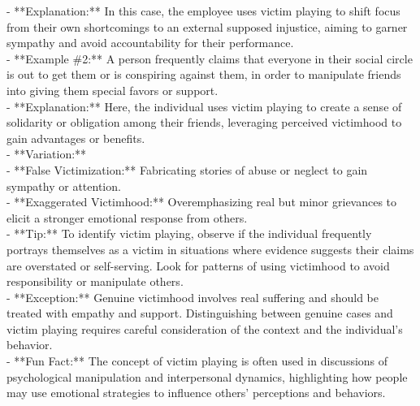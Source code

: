 \documentclass[a4paper,12pt,single,pdftex]{scrartcl}
\begin{document}
    
      - **Explanation:** In this case, the employee uses victim playing to shift focus from their own shortcomings to an external supposed injustice, aiming to garner sympathy and avoid accountability for their performance.
    \\

    
      - **Example \#2:** A person frequently claims that everyone in their social circle is out to get them or is conspiring against them, in order to manipulate friends into giving them special favors or support.
    \\

    
      - **Explanation:** Here, the individual uses victim playing to create a sense of solidarity or obligation among their friends, leveraging perceived victimhood to gain advantages or benefits.
    \\

    
      - **Variation:**
    \\

    
        - **False Victimization:** Fabricating stories of abuse or neglect to gain sympathy or attention.
    \\

    
        - **Exaggerated Victimhood:** Overemphasizing real but minor grievances to elicit a stronger emotional response from others.
    \\

    
      - **Tip:** To identify victim playing, observe if the individual frequently portrays themselves as a victim in situations where evidence suggests their claims are overstated or self-serving. Look for patterns of using victimhood to avoid responsibility or manipulate others.
    \\

    
      - **Exception:** Genuine victimhood involves real suffering and should be treated with empathy and support. Distinguishing between genuine cases and victim playing requires careful consideration of the context and the individual's behavior.
    \\

    
      - **Fun Fact:** The concept of victim playing is often used in discussions of psychological manipulation and interpersonal dynamics, highlighting how people may use emotional strategies to influence others' perceptions and behaviors.
    \\

  
\end{document}

